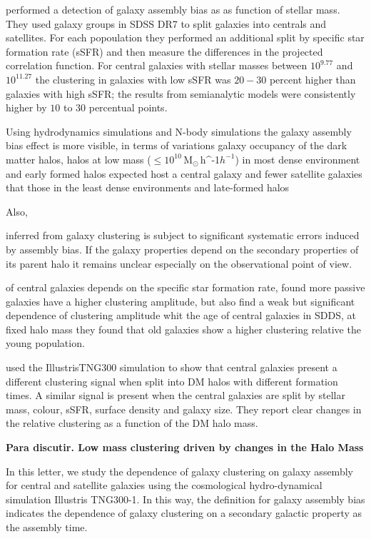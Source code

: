 \documentclass[fleqn,usenatbib]{mnras}
\newcommand{\Msunh}{\,{\rm M}$_{\odot}$\,\ifmmode h^{-1}\else $h^{-1}$\fi}
\begin{document}
\citet{2013MNRAS.433..515W} performed a detection of galaxy assembly
bias as as function of stellar mass. 
They used galaxy groups in SDSS DR7 to split galaxies into centrals
and satellites. For each popoulation they performed an additional
split by specific star formation rate (sSFR) and then measure the differences
in the projected correlation function.
For central galaxies with stellar masses between $10^{9.77}$ and $10^{11.27}$
the clustering in galaxies with low sSFR was $20-30$ percent higher
than galaxies with high sSFR; the results from semianalytic models
were consistently higher by $10$ to $30$ percentual points.




Using hydrodynamics simulations and
N-body simulations the galaxy assembly bias effect is more visible, in
terms of variations galaxy occupancy of the dark matter halos, halos
at low mass ($\leq 10^{10}$\Msunh) in most dense environment and early
formed halos expected host a central galaxy and fewer satellite
galaxies that those in the least dense environments and late-formed
halos \citep{2018MNRAS.480.3978A} 

Also, 

inferred from galaxy clustering is subject to significant systematic
errors induced by assembly bias. If the galaxy properties depend on
the secondary properties of its parent halo it remains unclear
especially on the observational point of view.   




of central galaxies depends on the specific star formation rate, found
more passive galaxies have a higher clustering amplitude, but
\citet{Lacerna_2014} also find a weak but significant dependence of
clustering amplitude whit the age of central galaxies in SDDS, at
fixed halo mass they found that old galaxies show a higher clustering
relative the young population.



\cite{2020MNRAS.tmp.1844M} used the IllustrisTNG300 simulation to show
that central galaxies present a different clustering signal when split
into DM halos with different formation times. 
A similar signal is present when the central galaxies are split by
stellar mass, colour, sSFR, surface density
and galaxy size. 
They report clear changes in the relative clustering as a function of
the DM halo mass.

\textbf{Para discutir. Low mass clustering driven by changes in the Halo Mass}

In this letter, we study the dependence of galaxy
clustering on galaxy assembly for central and satellite galaxies using
the cosmological hydro-dynamical simulation Illustris TNG300-1. In
this way, the definition for galaxy assembly bias indicates the
dependence of galaxy clustering on a secondary galactic property as
the assembly time. 
\end{document}
